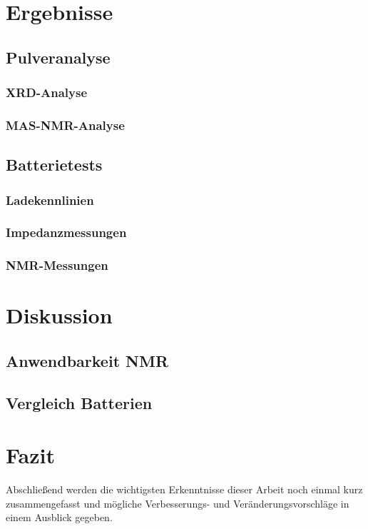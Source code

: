 \documentclass[a4paper, 11pt, headsepline,footsepline,twoside,abstract]{scrbook}
\begin{document}
\chapter{Ergebnisse}
\section{Pulveranalyse}
\subsection{XRD-Analyse}
\subsection{MAS-NMR-Analyse}
\section{Batterietests}
\subsection{Ladekennlinien}
\subsection{Impedanzmessungen}
\subsection{NMR-Messungen}
\chapter{Diskussion}
\section{Anwendbarkeit NMR}
\section{Vergleich Batterien}
\chapter{Fazit}
Abschließend werden die wichtigsten Erkenntnisse dieser Arbeit noch einmal kurz zusammengefasst und mögliche Verbesserungs- und Veränderungsvorschläge in einem Ausblick gegeben.
\end{document}
